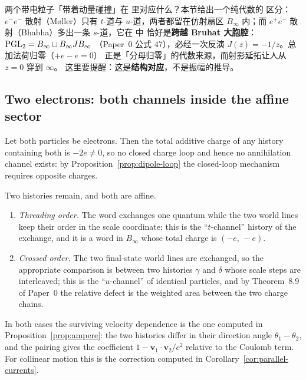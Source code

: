 
\begin{cnread}
两个带电粒子「带着动量碰撞」在 \AEG{} 里对应什么？本节给出一个纯代数的
区分：$e^-e^-$ 散射（M\o ller）只有 $t$-道与 $u$-道，两者都留在仿射扇区
$B_\infty$ 内；而 $e^+e^-$ 散射（Bhabha）多出一条 $s$-道，它在 \AEG{} 中
恰好是\textbf{跨越 Bruhat 大胞腔}：$\operatorname{PGL}_2=B_\infty\sqcup B_\infty JB_\infty$
（Paper~0 公式 47），必经一次反演 $J(z)=-1/z$。总加法荷归零（$+e-e=0$）
正是「分母归零」的代数来源，而射影延拓让人从 $z=0$ 穿到 $\infty$。
这里要提醒：这是\textbf{结构对应}，不是振幅的推导。
\end{cnread}

\subsection{Two electrons: both channels inside the affine sector}

Let both particles be electrons.  Then the total additive charge of any history
containing both is $-2e\ne0$, so no closed charge loop and hence no annihilation
channel exists: by Proposition~\ref{prop:dipole-loop} the closed-loop mechanism
requires opposite charges.

Two histories remain, and both are affine.

\begin{enumerate}[label=(\roman*)]
  \item \emph{Threading order.}  The word exchanges one quantum while the two
  world lines keep their order in the scale coordinate; this is the
  ``$t$-channel'' history of the exchange, and it is a word in
  $B_\infty$ whose total charge is $(-e,\,-e)$.
  \item \emph{Crossed order.}  The two final-state world lines are exchanged, so
  the appropriate comparison is between two histories $\gamma$ and $\delta$
  whose scale steps are interleaved; this is the ``$u$-channel'' of identical
  particles, and by Theorem~8.9 of Paper~0 the relative defect is the weighted
  area between the two charge chains.
\end{enumerate}

In both cases the surviving velocity dependence is the one computed in
Proposition~\ref{prop:ampere}: the two histories differ in their direction angle
$\theta_1-\theta_2$, and the pairing gives the coefficient
$1-\mathbf v_1\!\cdot\!\mathbf v_2/c^{2}$ relative to the Coulomb term.  For
collinear motion this is the correction computed in
Corollary~\ref{cor:parallel-currents}.

